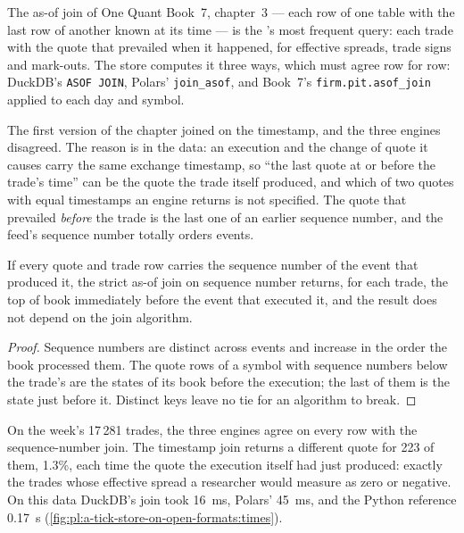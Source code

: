 The as-of join of One Quant Book~7, chapter~3 --- each row of one table with the last row of another known at its time --- is
the 's most frequent query: each trade with the quote that prevailed when it happened, for effective spreads, trade
signs and mark-outs. The store computes it three ways, which must agree row for row: DuckDB's \texttt{ASOF JOIN}, Polars'
\texttt{join\_asof}, and Book~7's \texttt{firm.pit.asof\_join} applied to each day and symbol.

\label{lst:pl:a-tick-store-on-open-formats:asof}

The first version of the chapter joined on the timestamp, and the three engines disagreed. The reason is in the data: an
execution and the change of quote it causes carry the same exchange timestamp, so ``the last quote at or before the trade's
time'' can be the quote the trade itself produced, and which of two quotes with equal timestamps an engine returns is not
specified. The quote that prevailed \emph{before} the trade is the last one of an earlier sequence number, and the feed's
sequence number totally orders events.

\begin{proposition}\label{prop:pl:a-tick-store-on-open-formats:seq}
If every quote and trade row carries the sequence number of the event that produced it, the strict as-of join on sequence
number returns, for each trade, the top of book immediately before the event that executed it, and the result does not depend
on the join algorithm.
\end{proposition}

\begin{proof}
Sequence numbers are distinct across events and increase in the order the book processed them. The quote rows of a symbol with
sequence numbers below the trade's are the states of its book before the execution; the last of them is the state just before
it. Distinct keys leave no tie for an algorithm to break.
\end{proof}

On the week's 17\,281 trades, the three engines agree on every row with the sequence-number join. The timestamp join returns a
different quote for 223 of them, 1.3\%, each time the quote the execution itself had just produced: exactly the trades whose
effective spread a researcher would measure as zero or negative. On this data DuckDB's join took 16~ms, Polars' 45~ms, and the
Python reference 0.17~s (\cref{fig:pl:a-tick-store-on-open-formats:times}).

